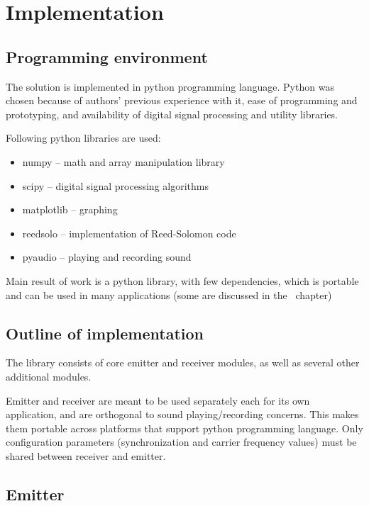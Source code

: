 \chapter{Implementation}

\section{Programming environment}

The solution is implemented in python programming language. Python was chosen because of authors' previous experience with it, ease of programming and prototyping, and availability of digital signal processing and utility libraries.

Following python libraries are used:

\begin{itemize}
  \item numpy -- math and array manipulation library
  \item scipy -- digital signal processing algorithms
  \item matplotlib -- graphing
  \item reedsolo -- implementation of Reed-Solomon code
  \item pyaudio -- playing and recording sound
\end{itemize}

Main result of work is a python library, with few dependencies, which is portable and can be used in many applications (some are discussed in the~ chapter)

\section{Outline of implementation}

The library consists of core emitter and receiver modules, as well as several other additional modules.

Emitter and receiver are meant to be used separately each for its own application, and are orthogonal
to sound playing/recording concerns. This makes them portable across platforms that support python programming language.
Only configuration parameters (synchronization and carrier frequency values) must be shared between receiver and emitter.

\clearpage

\section{Emitter}

